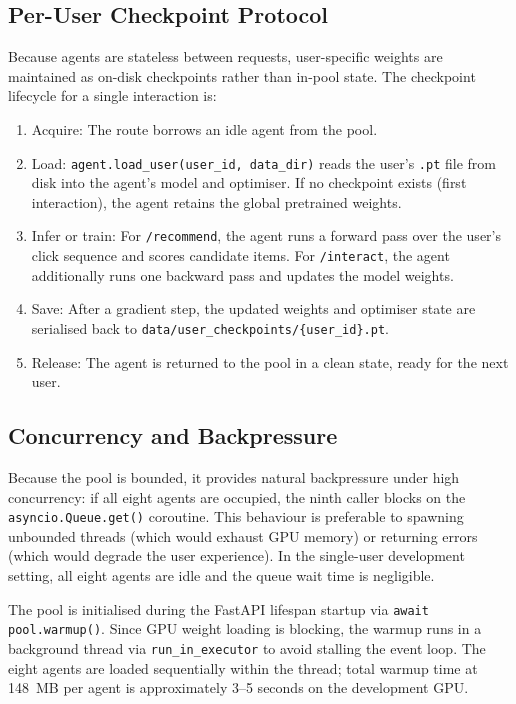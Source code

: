 \subsection{Per-User Checkpoint Protocol}

Because agents are stateless between requests, user-specific weights are maintained as on-disk checkpoints rather than in-pool state.
The checkpoint lifecycle for a single interaction is:

\begin{enumerate}
    \item Acquire: The route borrows an idle agent from the pool.
    \item Load: \texttt{agent.load\_user(user\_id, data\_dir)} reads the user's \texttt{.pt} file from disk into the agent's model and optimiser.
        If no checkpoint exists (first interaction), the agent retains the global pretrained weights.
    \item Infer or train: For \texttt{/recommend}, the agent runs a forward pass over the user's click sequence and scores candidate items.
        For \texttt{/interact}, the agent additionally runs one backward pass and updates the model weights.
    \item Save: After a gradient step, the updated weights and optimiser state are serialised back to \texttt{data/user\_checkpoints/\{user\_id\}.pt}.
    \item Release: The agent is returned to the pool in a clean state, ready for the next user.
\end{enumerate}

\subsection{Concurrency and Backpressure}

Because the pool is bounded, it provides natural backpressure under high concurrency: if all eight agents are occupied, the ninth caller blocks on the \texttt{asyncio.Queue.get()} coroutine.
This behaviour is preferable to spawning unbounded threads (which would exhaust GPU memory) or returning errors (which would degrade the user experience).
In the single-user development setting, all eight agents are idle and the queue wait time is negligible.

The pool is initialised during the FastAPI lifespan startup via \texttt{await pool.warmup()}.
Since GPU weight loading is blocking, the warmup runs in a background thread via \texttt{run\_in\_executor} to avoid stalling the event loop.
The eight agents are loaded sequentially within the thread; total warmup time at 148~MB per agent is approximately 3–5 seconds on the development GPU.


